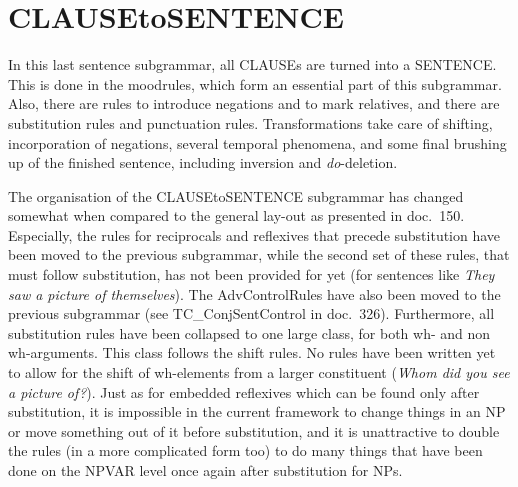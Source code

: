 \section{CLAUSEtoSENTENCE}
In this last sentence subgrammar, all CLAUSEs are turned into a SENTENCE. This 
is done in the moodrules, which form an essential part of this subgrammar.
Also, there are rules to introduce negations and to mark relatives, and there 
are substitution rules and 
punctuation rules. Transformations take care of shifting, incorporation of 
negations, several temporal phenomena, and some final brushing up of the 
finished sentence, including inversion and {\em do\/}-deletion.

The organisation of the CLAUSEtoSENTENCE subgrammar has changed somewhat when 
compared to the general lay-out as presented in doc.\ 150. Especially,
the rules for reciprocals and reflexives that precede substitution have been 
moved to the previous subgrammar, while the second set of these rules, that 
must follow substitution, has not been provided for yet (for sentences like 
{\em They saw a picture of themselves\/}). The AdvControlRules 
have also been moved to the previous subgrammar (see TC\_ConjSentControl in 
doc.\ 326). Furthermore, all substitution rules have been collapsed to one 
large class, for both wh- and non wh-arguments. This class follows the shift 
rules. No rules have been written yet to allow for the shift of wh-elements 
from a larger constituent ({\em Whom did you see a picture of?\/}). Just as 
for embedded reflexives which can be found only after 
substitution, it is impossible in the current framework to change things in an 
NP or move something out of it before substitution, and it is unattractive to 
double the rules (in a more complicated form too) to do many 
things that have been done on the NPVAR level once again after substitution for 
NPs.

